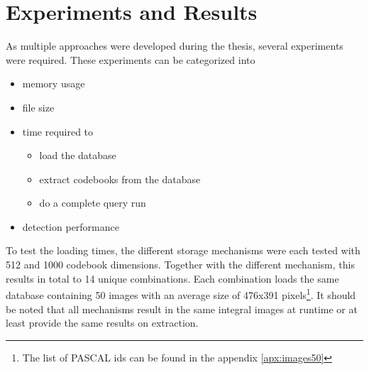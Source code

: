 \chapter{Experiments and Results}
\label{cha:experiments}

As multiple approaches were developed during the thesis, several experiments were required. These experiments can be categorized into 

\begin{itemize}
\item memory usage
\item file size
\item time required to
    \begin{itemize}
    \item load the database
    \item extract codebooks from the database
    \item do a complete query run
    \end{itemize}
\item detection performance
\end{itemize}

To test the loading times, the different storage mechanisms were each tested with 512 and 1000 codebook dimensions. Together with the different mechanism, this results in total to 14 unique combinations. Each combination loads the same database containing 50 images with an average size of 476x391 pixels\footnote{The list of PASCAL ids can be found in the appendix \ref{apx:images50}}. It should be noted that all mechanisms result in the same integral images at runtime or at least provide the same results on extraction.



